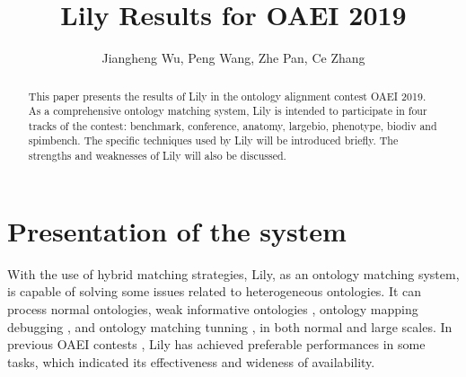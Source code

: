 \documentclass{llncs}
\begin{document}
\mainmatter              %
\title{Lily Results for OAEI 2019}
\author{Jiangheng Wu, Peng Wang, Zhe Pan, Ce Zhang}


\maketitle

\begin{abstract}
This paper presents the results of Lily in the ontology alignment contest OAEI 2019. As a comprehensive ontology matching system, Lily is intended to participate in four tracks of the contest: benchmark, conference, anatomy, largebio, phenotype, biodiv and spimbench. The specific techniques used by Lily will be introduced briefly. The strengths and weaknesses of Lily will also be discussed.
\end{abstract}

\section{Presentation of the system}
With the use of hybrid matching strategies, Lily, as an ontology matching system, is capable of solving some issues related to heterogeneous ontologies. It can process normal ontologies, weak informative ontologies \cite{simprop}, ontology mapping debugging \cite{om_dbg}, and ontology matching tunning \cite{param_tuning}, in both normal and large scales. In previous OAEI contests \cite{lily_oaei2009,lily_oaei2008,lily_oaei2007}, Lily has achieved preferable performances in some tasks, which indicated its effectiveness and wideness of availability. \par
\end{document}
